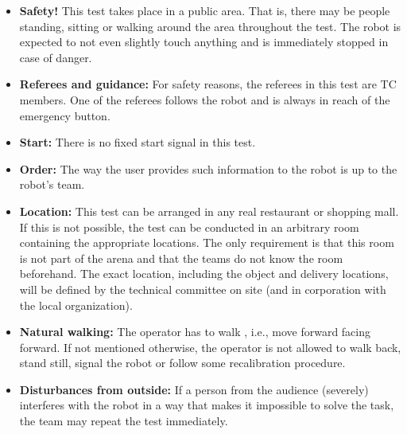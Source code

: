 \begin{itemize}
\item \textbf{Safety!} This test takes place in a public area. That is, there may be people standing, sitting or walking around the area throughout the test. The robot is expected to not even slightly touch anything and is immediately stopped in case of danger.

\item \textbf{Referees and guidance:} For safety reasons, the referees in this test are TC members. One of the referees follows the robot and is always in reach of the emergency button.

\item \textbf{Start:} There is no fixed start signal in this test.

\item \textbf{Order:} The way the user provides such information to the robot is up to the robot's team.

\item \textbf{Location:} This test can be arranged in any real restaurant or shopping mall. If this is not possible, the test can be conducted in an arbitrary room containing the appropriate locations. The only requirement is that this room is not part of the arena and that the teams do not know the room beforehand. The exact location, including the object and delivery locations, will be defined by the technical committee on site (and in corporation with the local organization).

\item \textbf{Natural walking:} The operator has to walk , i.e., move forward facing forward. If not mentioned otherwise, the operator is not allowed to walk back, stand still, signal the robot or follow some recalibration procedure.

\item \textbf{Disturbances from outside:} If a person from the audience (severely) interferes with the robot in a way that makes it impossible to solve the task, the team may repeat the test immediately.
\end{itemize}




